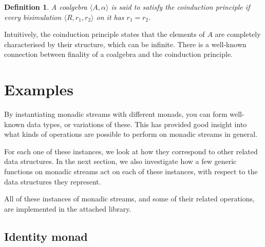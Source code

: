 \documentclass{article}
\newtheorem{definition}{Definition}
\begin{document}
\begin{definition}\label{def:coinduction}
A coalgebra $\langle A,\alpha\rangle$ is said to satisfy the {\em coinduction principle} if every bisimulation $\langle R,r_1,r_2\rangle$ on it has $r_1=r_2$.
\end{definition}

Intuitively, the coinduction principle states that the elements of $A$ are completely characterised by their structure, which can be infinite.
There is a well-known connection between finality of a coalgebra and the coinduction principle.











































\section{Examples}

By instantiating monadic streams with different monads, you can form well-known data types, or variations of these. This has provided good insight into what kinds of operations are possible to perform on monadic streams in general.

For each one of these instances, we look at how they correspond to other related data structures. In the next section, we also investigate how a few generic functions on monadic streams act on each of these instances, with respect to the data structures they represent.

All of these instances of monadic streams, and some of their related operations, are implemented in the attached library.

\subsection{Identity monad}
\end{document}
